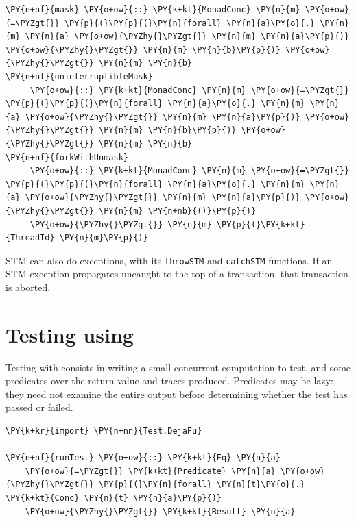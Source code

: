 \begin{Verbatim}[commandchars=\\\{\}]
\PY{n+nf}{mask} \PY{o+ow}{::} \PY{k+kt}{MonadConc} \PY{n}{m} \PY{o+ow}{=\PYZgt{}} \PY{p}{(}\PY{p}{(}\PY{n}{forall} \PY{n}{a}\PY{o}{.} \PY{n}{m} \PY{n}{a} \PY{o+ow}{\PYZhy{}\PYZgt{}} \PY{n}{m} \PY{n}{a}\PY{p}{)} \PY{o+ow}{\PYZhy{}\PYZgt{}} \PY{n}{m} \PY{n}{b}\PY{p}{)} \PY{o+ow}{\PYZhy{}\PYZgt{}} \PY{n}{m} \PY{n}{b}
\PY{n+nf}{uninterruptibleMask}
     \PY{o+ow}{::} \PY{k+kt}{MonadConc} \PY{n}{m} \PY{o+ow}{=\PYZgt{}} \PY{p}{(}\PY{p}{(}\PY{n}{forall} \PY{n}{a}\PY{o}{.} \PY{n}{m} \PY{n}{a} \PY{o+ow}{\PYZhy{}\PYZgt{}} \PY{n}{m} \PY{n}{a}\PY{p}{)} \PY{o+ow}{\PYZhy{}\PYZgt{}} \PY{n}{m} \PY{n}{b}\PY{p}{)} \PY{o+ow}{\PYZhy{}\PYZgt{}} \PY{n}{m} \PY{n}{b}
\PY{n+nf}{forkWithUnmask}
     \PY{o+ow}{::} \PY{k+kt}{MonadConc} \PY{n}{m} \PY{o+ow}{=\PYZgt{}} \PY{p}{(}\PY{p}{(}\PY{n}{forall} \PY{n}{a}\PY{o}{.} \PY{n}{m} \PY{n}{a} \PY{o+ow}{\PYZhy{}\PYZgt{}} \PY{n}{m} \PY{n}{a}\PY{p}{)} \PY{o+ow}{\PYZhy{}\PYZgt{}} \PY{n}{m} \PY{n+nb}{()}\PY{p}{)}
     \PY{o+ow}{\PYZhy{}\PYZgt{}} \PY{n}{m} \PY{p}{(}\PY{k+kt}{ThreadId} \PY{n}{m}\PY{p}{)}
\end{Verbatim}

STM can also do exceptions, with its \texttt{throwSTM} and
\texttt{catchSTM} functions. If an STM exception propagates uncaught
to the top of a transaction, that transaction is aborted.

\section{Testing using \dejafu{}}
\label{sec:dejafu-testing}

Testing with \dejafu{} consists in writing a small concurrent
computation to test, and some predicates over the return value and
traces produced. Predicates may be lazy: they need not examine the
entire output before determining whether the test has passed or
failed.



\begin{Verbatim}[commandchars=\\\{\}]
\PY{k+kr}{import} \PY{n+nn}{Test.DejaFu}

\PY{n+nf}{runTest} \PY{o+ow}{::} \PY{k+kt}{Eq} \PY{n}{a}
    \PY{o+ow}{=\PYZgt{}} \PY{k+kt}{Predicate} \PY{n}{a} \PY{o+ow}{\PYZhy{}\PYZgt{}} \PY{p}{(}\PY{n}{forall} \PY{n}{t}\PY{o}{.} \PY{k+kt}{Conc} \PY{n}{t} \PY{n}{a}\PY{p}{)}
    \PY{o+ow}{\PYZhy{}\PYZgt{}} \PY{k+kt}{Result} \PY{n}{a}
\end{Verbatim}

